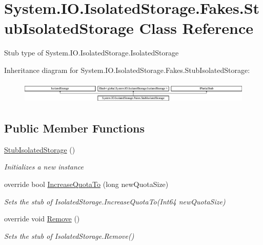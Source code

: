 \hypertarget{class_system_1_1_i_o_1_1_isolated_storage_1_1_fakes_1_1_stub_isolated_storage}{\section{System.\-I\-O.\-Isolated\-Storage.\-Fakes.\-Stub\-Isolated\-Storage Class Reference}
\label{class_system_1_1_i_o_1_1_isolated_storage_1_1_fakes_1_1_stub_isolated_storage}
}


Stub type of System.\-I\-O.\-Isolated\-Storage.\-Isolated\-Storage 


Inheritance diagram for System.\-I\-O.\-Isolated\-Storage.\-Fakes.\-Stub\-Isolated\-Storage\-:\begin{figure}[H]
\begin{center}
\leavevmode
\includegraphics[height=1.069723cm]{class_system_1_1_i_o_1_1_isolated_storage_1_1_fakes_1_1_stub_isolated_storage}
\end{center}
\end{figure}
\subsection*{Public Member Functions}
\begin{DoxyCompactItemize}
\item 
\hyperlink{class_system_1_1_i_o_1_1_isolated_storage_1_1_fakes_1_1_stub_isolated_storage_aa4f421fb46b5c15a8e4fda7ef381724e}{Stub\-Isolated\-Storage} ()
\begin{DoxyCompactList}\small\item\em Initializes a new instance\end{DoxyCompactList}\item 
override bool \hyperlink{class_system_1_1_i_o_1_1_isolated_storage_1_1_fakes_1_1_stub_isolated_storage_a4afc6881f3b672db97f2b45edbd99ada}{Increase\-Quota\-To} (long new\-Quota\-Size)
\begin{DoxyCompactList}\small\item\em Sets the stub of Isolated\-Storage.\-Increase\-Quota\-To(\-Int64 new\-Quota\-Size)\end{DoxyCompactList}\item 
override void \hyperlink{class_system_1_1_i_o_1_1_isolated_storage_1_1_fakes_1_1_stub_isolated_storage_ad6eed7bcb3a088c6859f0f6e5a5f084e}{Remove} ()
\begin{DoxyCompactList}\small\item\em Sets the stub of Isolated\-Storage.\-Remove()\end{DoxyCompactList}\end{DoxyCompactItemize}

